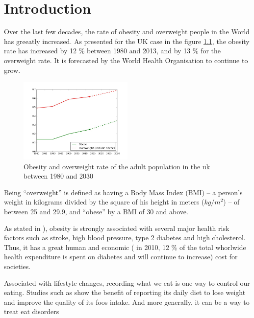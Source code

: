 \chapter{Introduction}

Over the last few decades, the rate of obesity and overweight people in the World has greeatly increased. As presented for the UK case in the figure \ref{fig:obesity_uk}, the obesity rate has increased by 12 \% between 1980 and 2013, and by 13 \% for the overweight rate. It is forecasted by the World Health Organisation to continue to grow.

\begin{figure}[h]
    \centering
    \includegraphics[width=0.5\textwidth,  height=0.455\textwidth ]{img/obesity_uk.jpg}
    \caption[Obesity and overweight rate of the adult population in the uk between 1980 and 2030. \textit{Source: World Health Organisation}]{Obesity and overweight rate of the adult population in the uk between 1980 and 2030}
    \label{fig:obesity_uk}
\end{figure}

Being \enquote{overweight} is defined as having a Body Mass Index (BMI) – a person's weight in kilograms divided by the square of his height in meters ($ kg / m^2 $) – of between 25 and 29.9, and \enquote{obese} by a BMI of 30 and above.

As stated in \cite{Mokdad2003}), obesity is strongly associated with several major health risk factors such as stroke, high blood pressure, type 2 diabetes and high cholesterol. Thus, it has a great human and economic (\cite{Zhang2010} in 2010, 12 \% of the total whorlwide health expenditure is spent on diabetes and will continue to increase) cost for societies.

Associated with lifestyle changes, recording what we eat is one way to control our eating. Studies such as \cite{Burke2011a} show the benefit of reporting its daily diet to lose weight and improve the quality of its foos intake. And more generally, it can be a way to treat eat disorders

